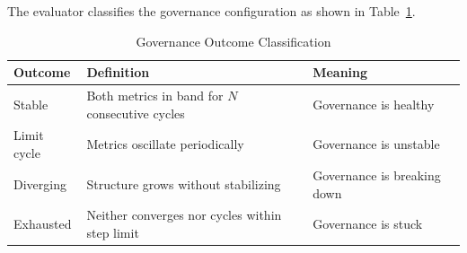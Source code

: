 \documentclass[sigconf,nonacm]{acmart}
\begin{document}
The evaluator classifies the governance configuration as shown in
Table~\ref{tab:outcomes}.

\begin{table}[t]
  \caption{Governance Outcome Classification}\label{tab:outcomes}
  \small
  \begin{tabular}{@{}llp{4cm}@{}}
    \toprule
    \textbf{Outcome} & \textbf{Definition} & \textbf{Meaning} \\
    \midrule
    Stable & Both metrics in band for $N$ consecutive cycles & Governance is healthy \\
    Limit cycle & Metrics oscillate periodically & Governance is unstable \\
    Diverging & Structure grows without stabilizing & Governance is breaking down \\
    Exhausted & Neither converges nor cycles within step limit & Governance is stuck \\
    \bottomrule
  \end{tabular}
\end{table}
\end{document}
